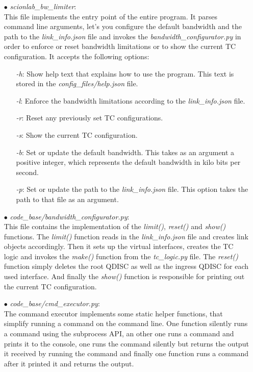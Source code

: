 \begin{enumerate}
\item[$\bullet$]\textit{scionlab\_bw\_limiter}:
\\
This file implements the entry point of the entire program. It parses command line arguments, let's you configure the default bandwidth and the path to the \textit{link\_info.json} file and invokes the \textit{bandwidth\_configurator.py} in order to enforce or reset bandwidth limitations or to show the current \acs{TC} configuration. It accepts the following options:
	\begin{enumerate}
	\item[\textit{-h}:] Show help text that explains how to use the program. This text is stored in the \textit{config\_files/help.json} file.
	\item[\textit{-l}:] Enforce the bandwidth limitations according to the \textit{link\_info.json} file.
	\item[\textit{-r}:] Reset any previously set \acs{TC} configurations.
	\item[\textit{-s}:] Show the current \acs{TC} configuration.
	\item[\textit{-b}:] Set or update the default bandwidth. This takes as an argument a positive integer, which represents the default bandwidth in kilo bits per second.
	\item[\textit{-p}:] Set or update the path to the \textit{link\_info.json} file. This option takes the path to that file as an argument.
	\end{enumerate}

\item[$\bullet$]\textit{code\_base/bandwidth\_configurator.py}:
\\
This file contains the implementation of the \textit{limit()}, \textit{reset()} and \textit{show()} functions. The \textit{limit()} function reads in the \textit{link\_info.json} file and creates link objects accordingly. Then it sets up the virtual interfaces, creates the \acs{TC} logic and invokes the \textit{make()} function from the \textit{tc\_logic.py} file. The \textit{reset()} function simply deletes the root \acs{QDISC} as well as the ingress \acs{QDISC} for each used interface. And finally the \textit{show()} function is responsible for printing out the current \acs{TC} configuration.

\item[$\bullet$]\textit{code\_base/cmd\_executor.py}:
\\
The command executor implements some static helper functions, that simplify running a command on the command line. One function silently runs a command using the subprocess \acs{API}, an other one runs a command and prints it to the console, one runs the command silently but returns the output it received by running the command and finally one function runs a command after it printed it and returns the output.


\end{enumerate}
